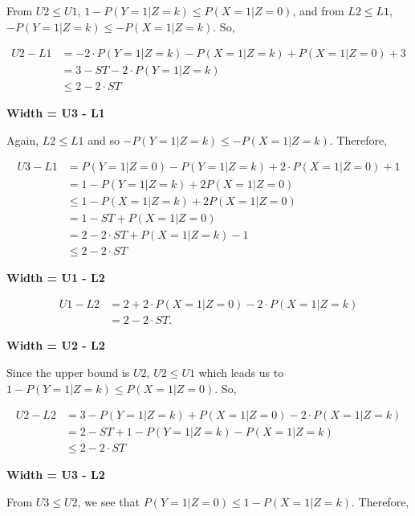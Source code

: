 \documentclass[AMA,STIX1COL,]{WileyNJD-v2}
\begin{document}
From \(U2 \le U1\), \(1 - P(Y = 1 | Z = k) \le P(X = 1 | Z = 0)\), and
from \(L2 \le L1\), \(-P(Y = 1 | Z = k) \le -P(X = 1 | Z = k)\). So,

\[\begin{aligned}
U2 - L1 &= -2\cdot P(Y = 1 | Z = k) - P(X = 1 | Z = k) + P(X = 1 | Z = 0) + 3 \\
        &= 3 - ST - 2\cdot P(Y = 1 | Z = k) \\
        &\le 2 - 2\cdot ST
\end{aligned}\]

\textbf{Width = U3 - L1}

Again, \(L2 \le L1\) and so \(-P(Y = 1 | Z = k) \le -P(X = 1 | Z = k)\).
Therefore,

\[\begin{aligned}
U3 - L1 &= P(Y = 1 | Z = 0) - P(Y = 1 | Z = k) + 2\cdot P(X = 1 | Z = 0) + 1 \\
        &= 1 - P(Y = 1 | Z = k) + 2 P(X = 1 | Z = 0) \\
        &\le 1 - P(X = 1 | Z = k) + 2 P(X = 1 | Z = 0) \\
        &= 1 - ST + P(X = 1 | Z = 0) \\
        &= 2 - 2\cdot ST + P(X = 1 | Z = k) - 1 \\
        &\le 2 - 2 \cdot ST
\end{aligned}\]

\textbf{Width = U1 - L2}

\[\begin{aligned}
U1 - L2 &= 2 + 2\cdot P(X = 1 | Z = 0) - 2\cdot P(X = 1 | Z = k) \\
        &= 2 - 2\cdot ST.
\end{aligned}\]

\textbf{Width = U2 - L2}

Since the upper bound is \(U2\), \(U2 \le U1\) which leads us to
\(1 - P(Y = 1 | Z = k) \le P(X = 1 | Z = 0)\). So,

\[\begin{aligned}
U2 - L2 &= 3 - P(Y = 1 | Z = k) + P(X = 1 | Z = 0) - 2\cdot P(X = 1 | Z = k) \\
        &= 2 - ST + 1 - P(Y = 1 | Z = k) - P(X = 1 | Z = k) \\
        &\le 2 - 2\cdot ST
\end{aligned}\]

\textbf{Width = U3 - L2}

From \(U3 \le U2\), we see that
\(P(Y = 1 | Z = 0) \le 1 - P(X = 1 | Z = k)\). Therefore,
\end{document}
